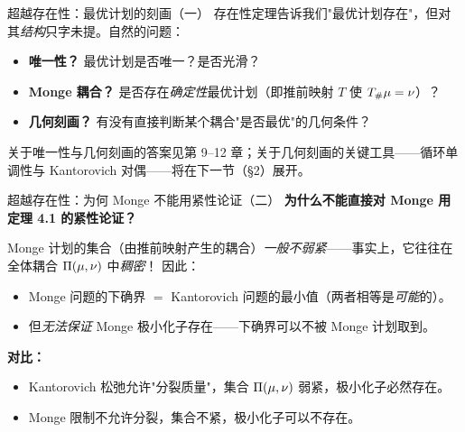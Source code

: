 \begin{frame}{超越存在性：最优计划的刻画（一）}
  存在性定理告诉我们"最优计划存在"，但对其\emph{结构}只字未提。自然的问题：

  \begin{itemize}
    \item \textbf{唯一性？} 最优计划是否唯一？是否光滑？
    \item \textbf{Monge 耦合？} 是否存在\emph{确定性}最优计划（即推前映射 $T$ 使 ${T}_{\#}\mu=\nu$）？
    \item \textbf{几何刻画？} 有没有直接判断某个耦合"是否最优"的几何条件？
  \end{itemize}

  关于唯一性与几何刻画的答案见第 9--12 章；关于几何刻画的关键工具——循环单调性与 Kantorovich 对偶——将在下一节（§2）展开。
\end{frame}

\begin{frame}{超越存在性：为何 Monge 不能用紧性论证（二）}
  \textbf{为什么不能直接对 Monge 用定理 4.1 的紧性论证？}

  Monge 计划的集合（由推前映射产生的耦合）\emph{一般不弱紧}——事实上，它往往在全体耦合 $\Pi(\mu,\nu)$ 中\emph{稠密}！
  因此：
  \begin{itemize}
    \item Monge 问题的下确界 $=$ Kantorovich 问题的最小值（两者相等是\emph{可能}的）。
    \item 但\emph{无法保证} Monge 极小化子存在——下确界可以不被 Monge 计划取到。
  \end{itemize}

  \textbf{对比：}
  \begin{itemize}\small
    \item Kantorovich 松弛允许"分裂质量"，集合 $\Pi(\mu,\nu)$ 弱紧，极小化子必然存在。
    \item Monge 限制不允许分裂，集合不紧，极小化子可以不存在。
  \end{itemize}

\end{frame}

